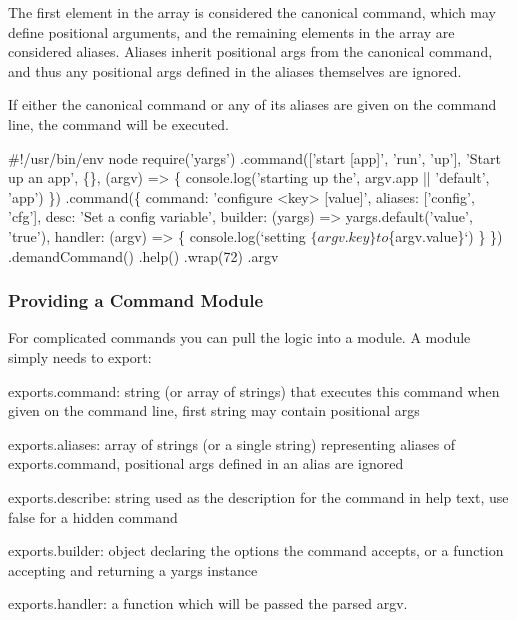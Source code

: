 The first element in the array is considered the canonical command, which may define positional arguments, and the remaining elements in the array are considered aliases. Aliases inherit positional args from the canonical command, and thus any positional args defined in the aliases themselves are ignored.

If either the canonical command or any of its aliases are given on the command line, the command will be executed.


\begin{DoxyCode}
#!/usr/bin/env node
require('yargs')
  .command(['start [app]', 'run', 'up'], 'Start up an app', \{\}, (argv) => \{
    console.log('starting up the', argv.app || 'default', 'app')
  \})
  .command(\{
    command: 'configure <key> [value]',
    aliases: ['config', 'cfg'],
    desc: 'Set a config variable',
    builder: (yargs) => yargs.default('value', 'true'),
    handler: (argv) => \{
      console.log(`setting $\{argv.key\} to $\{argv.value\}`)
    \}
  \})
  .demandCommand()
  .help()
  .wrap(72)
  .argv
\end{DoxyCode}





\subsubsection*{Providing a Command Module}

For complicated commands you can pull the logic into a module. A module simply needs to export\+:


\begin{DoxyItemize}
\item {\ttfamily exports.\+command}\+: string (or array of strings) that executes this command when given on the command line, first string may contain positional args
\item {\ttfamily exports.\+aliases}\+: array of strings (or a single string) representing aliases of {\ttfamily exports.\+command}, positional args defined in an alias are ignored
\item {\ttfamily exports.\+describe}\+: string used as the description for the command in help text, use {\ttfamily false} for a hidden command
\item {\ttfamily exports.\+builder}\+: object declaring the options the command accepts, or a function accepting and returning a yargs instance
\item {\ttfamily exports.\+handler}\+: a function which will be passed the parsed argv.
\end{DoxyItemize}


